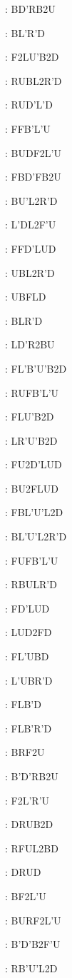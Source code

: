 \documentclass[9pt]{article}
\begin{document}
{\begin{multicols}{6}
: BD'RB2U

: BL'R'D

: F2LU'B2D

: RUBL2R'D

: RUD'L'D

: FFB'L'U

: BUDF2L'U

: FBD'FB2U

: BU'L2R'D

: L'DL2F'U

: FFD'LUD

: UBL2R'D

: UBFLD

: BLR'D

: LD'R2BU

: FL'B'U'B2D

: RUFB'L'U

: FLU'B2D

: LR'U'B2D

: FU2D'LUD

: BU2FLUD

: FBL'U'L2D

: BL'U'L2R'D

: FUFB'L'U

: RBULR'D

: FD'LUD

: LUD2FD

: FL'UBD

: L'UBR'D

: FLB'D

: FLB'R'D

: BRF2U

: B'D'RB2U

: F2L'R'U

: DRUB2D

: RFUL2BD

: DRUD

: BF2L'U

: BURF2L'U

: B'D'B2F'U

: RB'U'L2D


\end{multicols}}
\end{document}
